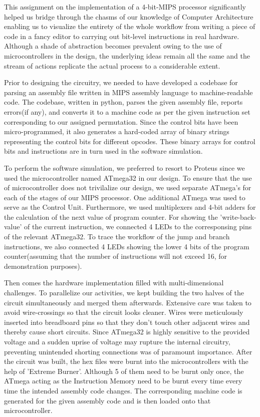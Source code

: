 \documentclass{article}
\begin{document}
		
		This assignment on the implementation of a 4-bit-MIPS processor significantly helped us bridge through the chasms of our knowledge of Computer Architecture enabling us to visualize the entirety of the whole workflow from writing a piece of code in a fancy editor to carrying out bit-level instructions in real hardware. Although a shade of abstraction becomes prevalent owing to the use of microcontrollers in the design, the underlying ideas remain all the same and the stream of actions replicate the actual process to a considerable extent.
		
		Prior to designing the circuitry, we needed to have developed a codebase for parsing an assembly file written in MIPS assembly language to machine-readable code. The codebase, written in python, parses the given assembly file, reports errors(if any), and converts it to a machine code as per the given instruction set corresponding to our assigned permutation. Since the control bits have been micro-programmed, it also generates a hard-coded array of binary strings representing the control bits for different opcodes. These binary arrays for control bits and instructions are in turn used in the software simulation.
		
		To perform the software simulation, we preferred to resort to Proteus since we used the microcontroller named ATmega32 in our design. To ensure that the use of microcontroller does not trivilalize our design, we used separate ATmega's for each of the stages of our MIPS processor. One additional ATmega was used to serve as the Control Unit. Furthermore, we used multiplexers and 4-bit adders for the calculation of the next value of program counter. For showing the 'write-back-value' of the current instruction, we connected 4 LEDs to the corresponsing pins of the relevant ATmega32. To trace the workflow of the jump and branch instructions, we also connected 4 LEDs showing the lower 4 bits of the program counter(assuming that the number of instructions will not exceed 16, for demonstration purposes).
		
		Then comes the hardware implementation filled with multi-dimensional challenges. To parallelize our activities, we kept building the two halves of the circuit simultaneously and merged them afterwards. Extensive care was taken to avoid wire-crossings so that the circuit looks cleaner. Wires were meticulously inserted into breadboard pins so that they don't touch other adjacent wires and thereby cause short circuits. Since ATmega32 is highly sensitive to the provided voltage and a sudden uprise of voltage may rupture the internal circuitry, preventing unintended shorting connections was of paramount importance. After the circuit was built, the hex files were burnt into the microcontrollers with the help of 'Extreme Burner'. Although 5 of them need to be burnt only once, the ATmega acting as the Instruction Memory need to be burnt every time every time the intended assembly code changes. The corresponding machine code is generated for the given assembly code and is then loaded onto that microcontroller.
		
\end{document}
